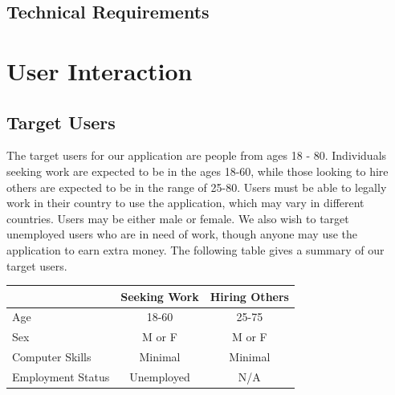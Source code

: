 \documentclass[11pt]{article}
\begin{document}
\subsection{Technical Requirements}


%
\section{User Interaction}\label{user-interaction}

\subsection{Target Users}

The target users for our application are people from ages 18 - 80. Individuals seeking work are expected to be in the ages 18-60, while those looking to hire others are expected to be in the range of 25-80. Users must be able to legally work in their country to use the application, which may vary in different countries. Users may be either male or female. We also wish to target unemployed users who are in need of work, though anyone may use the application to earn extra money. The following table gives a summary of our target users.

\begin{center}
  \begin{tabular}{| l | c | c |}
  \hline
    & Seeking Work & Hiring Others \\ \hline
    Age & 18-60 & 25-75 \\ \hline
    Sex & M or F & M or F \\ \hline
    Computer Skills & Minimal & Minimal \\ \hline
    Employment Status & Unemployed & N/A\\
    \hline
  \end{tabular}
\end{center}
\end{document}
